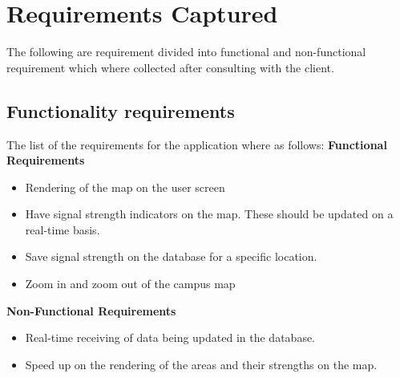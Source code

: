 \section{Requirements Captured}
The following are requirement divided into functional and non-functional requirement which where collected after consulting with the client.
\subsection*{Functionality requirements}
The list of the requirements for the application where as follows:
\newline\textbf{Functional Requirements}
\begin{itemize}
	\item Rendering of the map on the user screen
	\item Have signal strength indicators on the map. These should be updated on a real-time basis.
	\item Save signal strength on the database for a specific location.
	\item Zoom in and zoom out of the campus map
\end{itemize}
\textbf{Non-Functional Requirements}
\begin{itemize}
	\item Real-time receiving of data being updated in the database.
	\item Speed up on the rendering of the areas and their strengths on the map.
\end{itemize}
